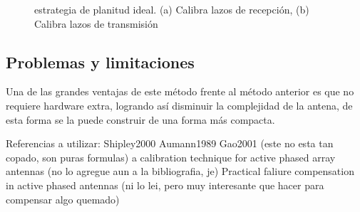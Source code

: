 \begin{figure}[H]
 \centering
 \caption{estrategia de planitud ideal. (a) Calibra lazos de recepción, (b) Calibra lazos de transmisión}
 \label{fig:ideal_strategy}
\end{figure}


\subsection{Problemas y limitaciones}

Una de las grandes ventajas de este método frente al método anterior es que no requiere hardware extra, logrando así 
disminuir la complejidad de la antena, de esta forma se la puede construir de una forma más compacta.

Referencias a utilizar: 
Shipley2000
Aumann1989
Gao2001 (este no esta tan copado, son puras formulas)
a calibration technique for active phased array antennas (no lo agregue aun a la bibliografia, je)
Practical faliure compensation in active phased antennas (ni lo lei, pero muy interesante que hacer para compensar algo quemado)




